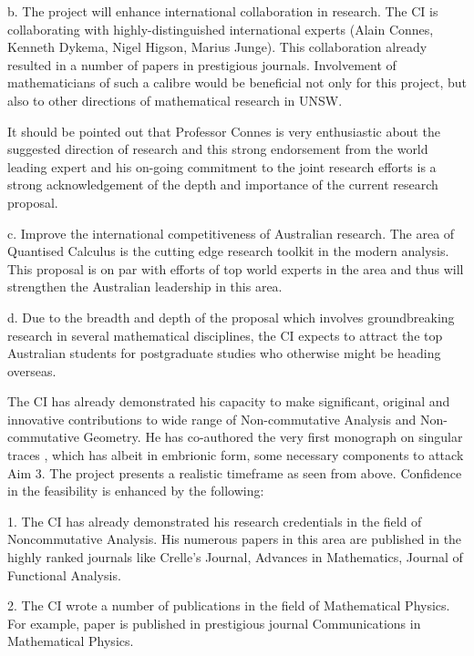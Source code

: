 \documentclass[12pt]{article}
\newcommand{\archeading}[1]{\vspace{.3cm} \noindent{\bfseries #1} \vspace{.1cm}   }
\begin{document}

b. The project will enhance international collaboration in research. The CI is collaborating with highly-distinguished international experts (Alain Connes, Kenneth Dykema, Nigel Higson, Marius Junge). This collaboration already resulted in a number of papers in prestigious journals. Involvement of mathematicians of such a calibre would be beneficial not only for this project, but also to other directions of mathematical research in UNSW.

It should be pointed out that Professor Connes is very enthusiastic about the suggested direction of research and this strong endorsement from the world leading expert and his on-going commitment to the joint research efforts is a strong acknowledgement of the depth and importance of the current research proposal.

c. Improve the international competitiveness of Australian research. The area of Quantised Calculus is the cutting edge research toolkit in the modern analysis. This proposal is on par with efforts of top world experts in the area and thus will strengthen the Australian leadership in this area.

d. Due to the breadth and depth of the proposal which involves groundbreaking research in several mathematical disciplines, the CI expects to attract the top Australian students for postgraduate studies who otherwise might be heading overseas.

\bigskip\archeading{Mentoring and capacity building}
The CI has already demonstrated his capacity to make significant, original and innovative contributions to wide range of Non-commutative Analysis and Non-commutative Geometry. He has co-authored the very first monograph on singular traces \cite{book}, which has albeit in embrionic form, some necessary components to attack Aim 3. The project presents a realistic timeframe as seen from above. Confidence in the feasibility is enhanced by the following:

1. The CI has already demonstrated his research credentials in the field of Noncommutative Analysis. His numerous papers in this area are published in the highly ranked journals like Crelle's Journal, Advances in Mathematics, Journal of Functional Analysis.

2. The CI wrote a number of publications in the field of Mathematical Physics. For example, paper \cite{SZ-cmp} is published in prestigious journal Communications in Mathematical Physics.
\end{document}
